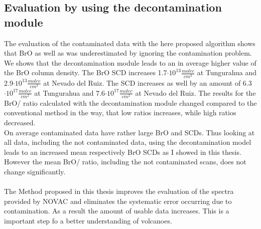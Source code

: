 \documentclass  [
  paper    = a4,
  BCOR     = 10mm,
  twoside,
  fontsize = 12pt,
  fleqn,
  toc      = bibnumbered,
  toc      = listofnumbered,
  numbers  = noendperiod,
  headings = normal,
  listof   = leveldown,
  version  = 3.03
]                                       {scrreprt}
\begin{document}
	\subsection*{Evaluation by using the decontamination module} 
	The evaluation of the contaminated data with the here proposed algorithm shows that BrO as well as  was underestimated by ignoring the contamination problem.
	We shows that the decontamination module leads to an in average higher value of the BrO column density. The BrO SCD increases 1.7$\cdot 10^{13}\frac{molec}{cm^2}$ at Tungurahua and 2.9$\cdot 10^{13}\frac{molec}{cm^2}$ at Nevado del Ruiz. The  SCD increases as well by an amount of 6.3$\cdot 10^{17}\frac{molec}{cm^2}$ at Tungurahua and 7.6$\cdot 10^{17}\frac{molec}{cm^2}$ at Nevado del Ruiz. The results for the BrO/ ratio calculated with the decontamination module changed compared to the conventional method in the way, that low ratios increases, while high ratios decreased.\\
	On average contaminated data have rather large BrO and  SCDs. Thus looking at all data, including the not contaminated data, using the decontamination model leads to an increased mean  respectively BrO SCDs as I showed in this thesis.
	However the mean BrO/ ratio, including the not contaminated scans, does not change significantly.\\
	\\
	The Method proposed in this thesis improves the evaluation of the spectra provided by NOVAC and eliminates the systematic error occurring due to contamination. As a result the amount of usable data increases. This is a important step fo a better understanding of volcanoes.
	

	
\end{document}
